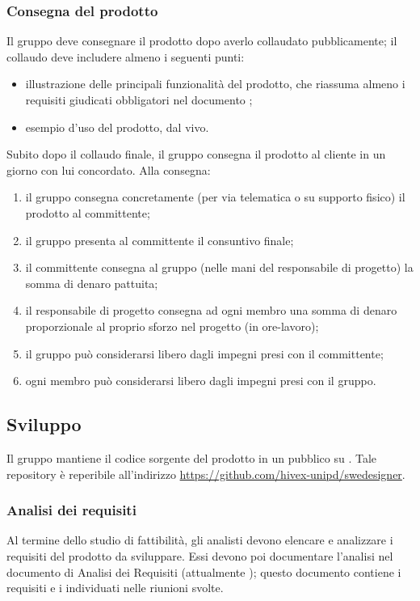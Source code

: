 \subsubsection{Consegna del prodotto}
Il gruppo deve consegnare il prodotto dopo averlo collaudato pubblicamente; il collaudo deve includere almeno i seguenti punti:
\begin{itemize}
	\item illustrazione delle principali funzionalità del prodotto, che riassuma almeno i requisiti giudicati obbligatori nel documento \AdR;
	\item esempio d'uso del prodotto, dal vivo.
\end{itemize}

Subito dopo il collaudo finale, il gruppo consegna il prodotto al cliente in un giorno con lui concordato. Alla consegna:
\begin{enumerate}
	\item il gruppo consegna concretamente (per via telematica o su supporto fisico) il prodotto al committente;
	\item il gruppo presenta al committente il consuntivo finale;
	\item il committente consegna al gruppo (nelle mani del responsabile di progetto) la somma di denaro pattuita;
	\item il responsabile di progetto consegna ad ogni membro una somma di denaro proporzionale al proprio sforzo nel progetto (in ore-lavoro);
	\item il gruppo può considerarsi libero dagli impegni presi con il committente;
	\item ogni membro può considerarsi libero dagli impegni presi con il gruppo.
\end{enumerate}


\subsection{Sviluppo}
Il gruppo mantiene il codice sorgente del prodotto in un  pubblico su . Tale repository è reperibile all'indirizzo \url{https://github.com/hivex-unipd/swedesigner}.

\subsubsection{Analisi dei requisiti}
Al termine dello studio di fattibilità, gli analisti devono elencare e analizzare i requisiti del prodotto da sviluppare. Essi devono poi documentare l'analisi nel documento di Analisi dei Requisiti (attualmente \AdR); questo documento contiene i requisiti e i  individuati nelle riunioni svolte.

